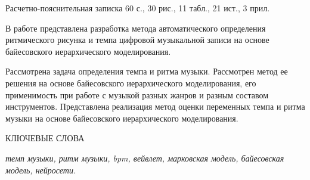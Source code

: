 
Расчетно-пояснительная записка 60 с., 30 рис., 11 табл., 21 ист., 3 прил.

В работе представлена разработка метода автоматического определения ритмического рисунка и темпа цифровой музыкальной записи на основе байесовского иерархического моделирования.

Рассмотрена задача определения темпа и ритма музыки. Рассмотрен метод ее решения на основе байесовского иерархического моделирования, его применимость при работе с музыкой разных жанров и разным составом инструментов. Представлена реализация метод оценки переменных темпа и ритма музыки на основе байесовского иерархического моделирования.

КЛЮЧЕВЫЕ СЛОВА

\textit{темп музыки, ритм музыки, bpm, вейвлет, марковская модель, байесовская модель, нейросети.}

\clearpage